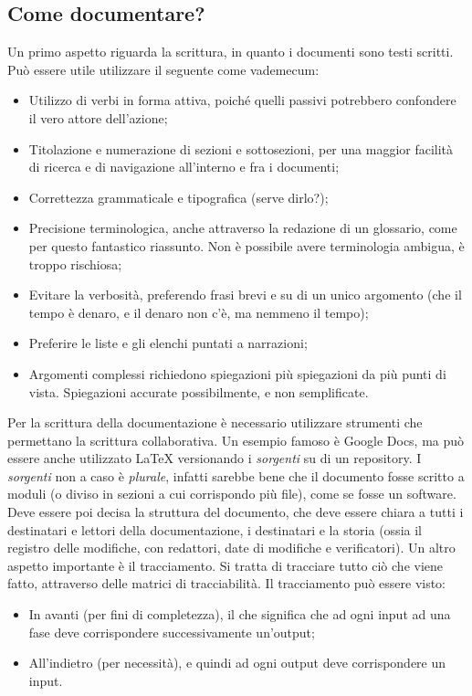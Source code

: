 \documentclass[../main]{subfiles}
\begin{document}
\subsection{Come documentare?}
Un primo aspetto riguarda la scrittura, in quanto i documenti sono testi scritti. Può essere utile utilizzare il seguente come vademecum:
\begin{itemize}
    \item Utilizzo di verbi in forma attiva, poiché quelli passivi potrebbero confondere il vero attore dell'azione;
    \item Titolazione e numerazione di sezioni e sottosezioni, per una maggior facilità di ricerca e di navigazione all'interno e fra i documenti;
    \item Correttezza grammaticale e tipografica (serve dirlo?);
    \item Precisione terminologica, anche attraverso la redazione di un glossario, come per questo fantastico riassunto. Non è possibile avere terminologia ambigua, è troppo rischiosa;
    \item Evitare la verbosità, preferendo frasi brevi e su di un unico argomento (che il tempo è denaro, e il denaro non c'è, ma nemmeno il tempo);
    \item Preferire le liste e gli elenchi puntati a narrazioni;
    \item Argomenti complessi richiedono spiegazioni più spiegazioni da più punti di vista. Spiegazioni accurate possibilmente, e non semplificate.
\end{itemize}
Per la scrittura della documentazione è necessario utilizzare strumenti che permettano la scrittura collaborativa. Un esempio famoso è Google Docs, ma può essere anche utilizzato \LaTeX{} versionando i \textit{sorgenti} su di un repository. I \textit{sorgenti} non a caso è \textit{plurale}, infatti sarebbe bene che il documento fosse scritto a moduli (o diviso in sezioni a cui corrispondo più file), come se fosse un software.\newline
Deve essere poi decisa la struttura del documento, che deve essere chiara a tutti i destinatari e lettori della documentazione, i destinatari e la storia (ossia il registro delle modifiche, con redattori, date di modifiche e verificatori).\newline
Un altro aspetto importante è il tracciamento. Si tratta di tracciare tutto ciò che viene fatto, attraverso delle matrici di tracciabilità.\newline
Il tracciamento può essere visto:
\begin{itemize}
    \item In avanti (per fini di completezza), il che significa che ad ogni input ad una fase deve corrispondere successivamente un'output;
    \item All'indietro (per necessità), e quindi ad ogni output deve corrispondere un input.
\end{itemize}
\end{document}
